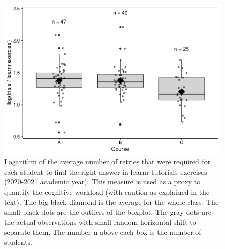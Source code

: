 \documentclass{aims} %
\theoremstyle{definition}
\begin{document}
\begin{figure}
\includegraphics[width=1\linewidth]{teaching_data_science_files/figure-latex/fig_learn_trials-1} \caption{\label{fig:fig_learn_trials} Logarithm of the average number of retries that were required for each student to find the right answer in learnr tutorials exercises (2020-2021 academic year). This measure is used as a proxy to quantify the cognitive workload (with caution as explained in the text). The big black diamond is the average for the whole class. The small black dots are the outliers of the boxplot. The gray dots are the actual observations with small random horizontal shift to separate them. The number n above each box is the number of students.}\label{fig:fig_learn_trials}
\end{figure}
\end{document}
